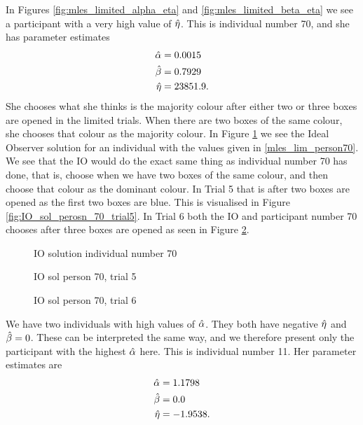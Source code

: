 In Figures \ref{fig:mles_limited_alpha_eta} and \ref{fig:mles_limited_beta_eta} we see a participant with a very high value of $\hat{\eta}$. This is individual number 70, and she has  parameter estimates
\begin{equation}
\label{mles_lim_person70}
    \begin{aligned}
        \hat{\alpha} &= 0.0015\\
        \hat{\beta} &= 0.7929\\
        \hat{\eta} &= 23851.9.
    \end{aligned}
\end{equation}
She chooses what she thinks is the majority colour after either two or three boxes are opened in the limited trials. When there are two boxes of the same colour, she chooses that colour as the majority colour. In Figure \ref{fig:IO_sol_person_70} we see the Ideal Observer solution for an individual with the values given in \eqref{mles_lim_person70}. We see that the IO would do the exact same thing as individual number 70 has done, that is, choose when we have two boxes of the same colour, and then choose that colour as the dominant colour. In Trial 5 that is after two boxes are opened as the first two boxes are blue. This is visualised in Figure \ref{fig:IO_sol_perosn_70_trial5}. In Trial 6 both the IO and participant number 70 chooses after three boxes are opened as seen in Figure \ref{fig:IO_sol_person70_trial6}.
\begin{figure}
    \centering
    \scalebox{0.7}{}
    \caption{IO solution individual number 70}
    \label{fig:IO_sol_person_70}
\end{figure}

\begin{figure}
    \centering
    \begin{minipage}{0.48\textwidth}
        \centering
        \scalebox{0.7}{}
        \caption{IO sol person 70, trial 5}
        \label{fig:IO_sol_perosn_70_trial5}
    \end{minipage}
    \hfill
    \begin{minipage}{0.48\textwidth}
        \centering
        \scalebox{0.7}{}
        \caption{IO sol person 70, trial 6}
        \label{fig:IO_sol_person70_trial6}
    \end{minipage}
\end{figure}

We have two individuals with high values of $\hat{\alpha}$. They both have negative $\hat{\eta}$ and $\hat{\beta}=0$. These can be interpreted the same way, and we therefore present only the participant with the highest $\hat{\alpha}$ here. This is individual number 11. Her parameter estimates are
\begin{equation}
\label{mles_lim_person11}
    \begin{aligned}
        \hat{\alpha} &= 1.1798\\
        \hat{\beta} &= 0.0\\
        \hat{\eta} &= -1.9538.
    \end{aligned}
\end{equation}





